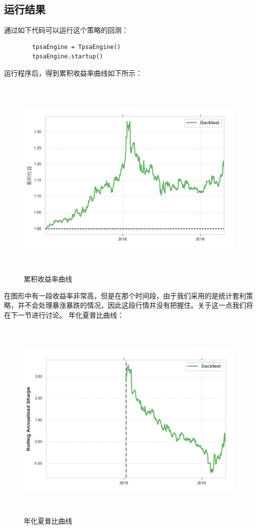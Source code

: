 \documentclass{article}
\begin{document}
\subsection{运行结果}
通过如下代码可以运行这个策略的回测：
\begin{lstlisting}
        tpsaEngine = TpsaEngine()
        tpsaEngine.startup()
\end{lstlisting}
运行程序后，得到累积收益率曲线如下所示：
\begin{figure}[H]
	\caption{累积收益率曲线}
	\label{f000058}
	\centering
	\includegraphics[height=10cm]{images/f000058}
\end{figure}
在图形中有一段收益率非常高，但是在那个时间段，由于我们采用的是统计套利策略，并不会处理暴涨暴跌的情况，因此这段行情并没有把握住。关于这一点我们将在下一节进行讨论。\newline
年化夏普比曲线：
\begin{figure}[H]
	\caption{年化夏普比曲线}
	\label{f000059}
	\centering
	\includegraphics[height=10cm]{images/f000059}
\end{figure}
\end{document}
